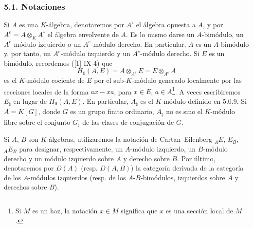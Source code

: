 \subsubsection*{5.1. Notaciones}

Si $A$ es una $K$-álgebra, denotaremos por $A^\circ$ el álgebra opuesta a $A$, y por $A^e=A\otimes_KA^\circ$ el álgebra envolvente de $A$. Es lo mismo darse un $A$-bimódulo, un $A^e$-módulo izquierdo o un $A^e$-módulo derecho. En particular, $A$ es un $A$-bimódulo y, por tanto, un $A^e$-módulo izquierdo y un $A^e$-módulo derecho. Si $E$ es un bimódulo, recordemos ([1] IX 4) que
\[
H_0(A,E)=A\otimes_{A^e}E=E\otimes_{A^e}A
\]
es el $K$-módulo cociente de $E$ por el sub-$K$-módulo generado localmente por las secciones locales de la forma $ax-xa$, para $x\in E$, $a\in A$\footnote{Si $M$ es un haz, la notación $x\in M$ significa que $x$ es una sección local de $M$.}. A veces escribiremos $E_\natural$ en lugar de $H_0(A,E)$. En particular, $A_\natural$ es el $K$-módulo definido en 5.0.9. Si $A=K[G]$, donde $G$ es un grupo finito ordinario, $A_\natural$ no es sino el $K$-módulo libre sobre el conjunto $G_\natural$ de las clases de conjugación de $G$.

Si $A$, $B$ son $K$-álgebras, utilizaremos la notación de Cartan--Eilenberg ${}_AE$, $E_B$, ${}_AE_B$ para designar, respectivamente, un $A$-módulo izquierdo, un $B$-módulo derecho y un módulo izquierdo sobre $A$ y derecho sobre $B$. Por último, denotaremos por $D(A)$ (resp. $D(A,B)$) la categoría derivada de la categoría de los $A$-módulos izquierdos (resp. de los $A$-$B$-bimódulos, izquierdos sobre $A$ y derechos sobre $B$).
